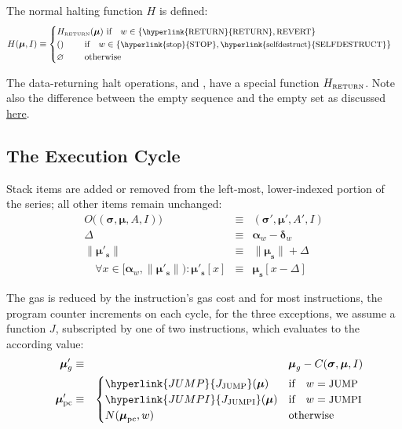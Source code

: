 \documentclass[9pt,oneside]{amsart}
\begin{document}
\begin{multicols}{2}
The normal halting function $H$ is defined:
\begin{equation}
H(\boldsymbol{\mu}, I) \equiv \begin{cases}
H_{\text{\tiny RETURN}}(\boldsymbol{\mu}) \ \text{if} \quad w \in \{\text{\small \hyperlink{RETURN}{RETURN}}, \text{\small REVERT}\} &\\
() \quad\quad\ \text{if} \quad w \in \{ \text{\small \hyperlink{stop}{STOP}}, \text{\small \hyperlink{selfdestruct}{SELFDESTRUCT}} \} &\\
\varnothing \quad\quad\ \text{otherwise}&
\end{cases}
\end{equation}

The data-returning halt operations, \hyperlink{RETURN}{} and , have a special function $H_{\text{\tiny RETURN}}$. Note also the difference between the empty sequence and the empty set as discussed \hyperlink{empty_sequence_vs_empty_set}{here}.

\subsection{The Execution Cycle}

Stack items are added or removed from the left-most, lower-indexed portion of the series; all other items remain unchanged:
\begin{eqnarray}
O\big((\boldsymbol{\sigma}, \boldsymbol{\mu}, A, I)\big) & \equiv & (\boldsymbol{\sigma}', \boldsymbol{\mu}', A', I) \\
\Delta & \equiv & \mathbf{\alpha}_{w} - \mathbf{\delta}_{w} \\
\lVert\boldsymbol{\mu}'_{\mathbf{s}}\rVert & \equiv & \lVert\boldsymbol{\mu}_{\mathbf{s}}\rVert + \Delta \\
\quad \forall x \in [\mathbf{\alpha}_{w}, \lVert\boldsymbol{\mu}'_{\mathbf{s}}\rVert): \boldsymbol{\mu}'_{\mathbf{s}}[x] & \equiv & \boldsymbol{\mu}_{\mathbf{s}}[x-\Delta]
\end{eqnarray}

The gas is reduced by the instruction's gas cost and for most instructions, the program counter increments on each cycle, for the three exceptions, we assume a function $J$, subscripted by one of two instructions, which evaluates to the according value:
\begin{eqnarray}
\quad \boldsymbol{\mu}'_{g} & \equiv & \boldsymbol{\mu}_{g} - C(\boldsymbol{\sigma}, \boldsymbol{\mu}, I) \label{eq:mu_pc}\\
\quad \boldsymbol{\mu}'_{\mathrm{pc}} & \equiv & \begin{cases}
\hyperlink{JUMP}{J_{\text{JUMP}}}(\boldsymbol{\mu}) & \text{if} \quad w = \text{\small JUMP} \\
\hyperlink{JUMPI}{J_{\text{JUMPI}}}(\boldsymbol{\mu}) & \text{if} \quad w = \text{\small JUMPI} \\
N(\boldsymbol{\mu}_{\mathrm{pc}}, w) & \text{otherwise}
\end{cases}
\end{eqnarray}


\end{multicols}
\end{document}
